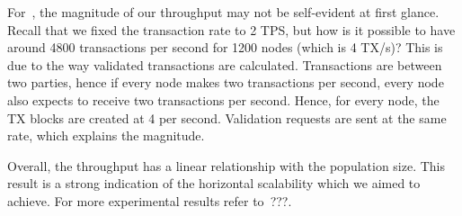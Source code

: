 For~,
the magnitude of our throughput may not be self-evident at first glance.
Recall that we fixed the transaction rate to 2 TPS,
but how is it possible to have around 4800 transactions per second for 1200 nodes (which is 4 TX/s)?
This is due to the way validated transactions are calculated.
Transactions are between two parties, hence if every node makes two transactions per second,
every node also expects to receive two transactions per second.
Hence, for every node, the TX blocks are created at 4 per second.
Validation requests are sent at the same rate, which explains the magnitude.

Overall, the throughput has a linear relationship with the population size.
This result is a strong indication of the horizontal scalability which we aimed to achieve.
For more experimental results refer to~\cite[Chapter 5]{checo}???.

